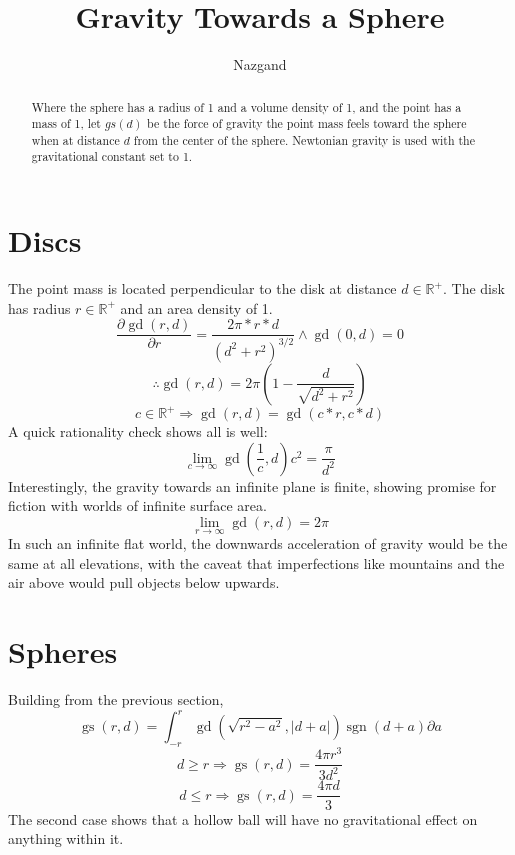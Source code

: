 \documentclass[]{article}
\title{Gravity Towards a Sphere}
\author{Nazgand}
\DeclareMathOperator{\sgn}{sgn}
\DeclareMathOperator{\gd}{gd}
\DeclareMathOperator{\gs}{gs}
\begin{document}
\maketitle

\begin{abstract}
Where the sphere has a radius of 1 and a volume density of 1, and the point has a mass of 1, let \(gs\left(d\right)\) be the force of gravity the point mass feels toward the sphere when at distance \(d\) from the center of the sphere. Newtonian gravity is used with the gravitational constant set to 1.
\end{abstract}

\section{Discs}
The point mass is located perpendicular to the disk at distance \(d\in\mathbb{R}^+\). The disk has radius \(r\in\mathbb{R}^+\) and an area density of 1.
\[\frac{\partial \gd\left(r,d\right)}{\partial r}=\frac{2\pi*r*d}{\left(d^2+r^2\right)^{3/2}}\land \gd\left(0,d\right)=0\]
\[\therefore \gd\left(r,d\right)=2\pi\left(1-\frac{d}{\sqrt{d^2+r^2}}\right)\]
\[c\in\mathbb{R}^+\Rightarrow \gd\left(r,d\right)=\gd\left(c*r,c*d\right)\]
A quick rationality check shows all is well:
\[\lim_{c\rightarrow\infty}\gd\left(\frac{1}{c},d\right)c^2=\frac{\pi}{d^2}\]
Interestingly, the gravity towards an infinite plane is finite, showing promise for fiction with worlds of infinite surface area.
\[\lim_{r\rightarrow\infty}\gd\left(r,d\right)=2\pi\]
In such an infinite flat world, the downwards acceleration of gravity would be the same at all elevations, with the caveat that imperfections like mountains and the air above would pull objects below upwards.
\section{Spheres}
Building from the previous section,
\[\gs\left(r,d\right)=\int_{-r}^{r}\gd\left(\sqrt{r^2-a^2},\left|d+a\right|\right)\sgn\left(d+a\right)\partial a\]
\[d\geq r\Rightarrow\gs\left(r,d\right)=\frac{4\pi r^3}{3d^2}\]
\[d\leq r\Rightarrow\gs\left(r,d\right)=\frac{4\pi d}{3}\]
The second case shows that a hollow ball will have no gravitational effect on anything within it.
\end{document}
